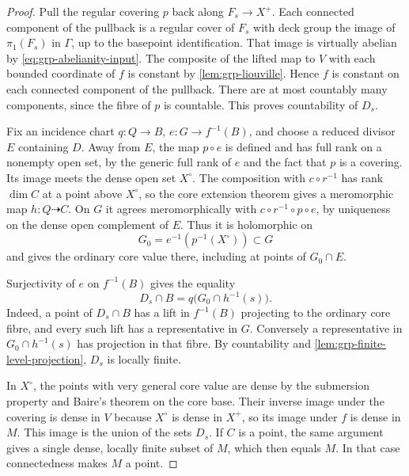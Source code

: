 \begin{proof}
Pull the regular covering $p$ back along $F_s\to X^+$. Each connected component of the pullback is a regular cover of $F_s$ with deck group the image of $\pi_1(F_s)$ in $\Gamma$, up to the basepoint identification.  That image is virtually abelian by \eqref{eq:grp-abelianity-input}.  The composite of the lifted map to $V$ with each bounded coordinate of $f$ is constant by \cref{lem:grp-liouville}.  Hence $f$ is constant on each connected component of the pullback.  There are at most countably many components, since the fibre of $p$ is countable.  This proves countability of $D_s$.

Fix an incidence chart $q:Q\to B$, $e:G\to f^{-1}(B)$, and choose a reduced divisor $E$ containing $D$. Away from $E$, the map $p\circ e$ is defined and has full rank on a nonempty open set, by the generic full rank of $e$ and the fact that $p$ is a covering. Its image meets the dense open set $X^\circ$. The composition with $c\circ r^{-1}$ has rank $\dim C$ at a point above $X^\circ$, so the core extension theorem gives a meromorphic map $h:Q\dashrightarrow C$. On $G$ it agrees meromorphically with $c\circ r^{-1}\circ p\circ e$, by uniqueness on the dense open complement of $E$. Thus it is holomorphic on
\[
 G_0=e^{-1}(p^{-1}(X^\circ))\subset G
\]
and gives the ordinary core value there, including at points of $G_0\cap E$.

Surjectivity of $e$ on $f^{-1}(B)$ gives the equality
\begin{equation}\label{eq:grp-full-incidence-level}
 D_s\cap B=q\bigl(G_0\cap h^{-1}(s)\bigr).
\end{equation}
Indeed, a point of $D_s\cap B$ has a lift in $f^{-1}(B)$ projecting to the ordinary core fibre, and every such lift has a representative in $G$. Conversely a representative in $G_0\cap h^{-1}(s)$ has projection in that fibre. By countability and \cref{lem:grp-finite-level-projection}, $D_s$ is locally finite.

In $X^\circ$, the points with very general core value are dense by the submersion property and Baire's theorem on the core base. Their inverse image under the covering is dense in $V$ because $X^\circ$ is dense in $X^+$, so its image under $f$ is dense in $M$. This image is the union of the sets $D_s$. If $C$ is a point, the same argument gives a single dense, locally finite subset of $M$, which then equals $M$. In that case connectedness makes $M$ a point.
\end{proof}

